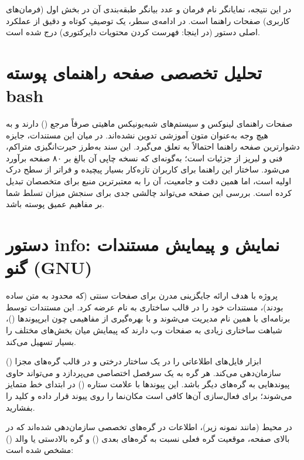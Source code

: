 در این نتیجه،  نمایانگر نام فرمان و عدد  بیانگر طبقه‌بندی آن در بخش اول (فرمان‌های کاربری) صفحات راهنما است. در ادامه‌ی سطر، یک توصیفِ کوتاه و دقیق از عملکرد اصلی دستور (در اینجا: فهرست کردن محتویات دایرکتوری) درج شده است.

\section{تحلیل تخصصی صفحه راهنمای پوسته bash}

صفحات راهنمای لینوکس و سیستم‌های شبه‌یونیکس ماهیتی صرفاً مرجع () دارند و به هیچ وجه به‌عنوان متون آموزشی تدوین نشده‌اند. در میان این مستندات، جایزه دشوارترین صفحه راهنما احتمالاً به  تعلق می‌گیرد. این سند به‌طرز حیرت‌انگیزی متراکم، فنی و لبریز از جزئیات است؛ به‌گونه‌ای که نسخه چاپی آن بالغ بر ۸۰ صفحه برآورد می‌شود. ساختار این راهنما برای کاربران تازه‌کار بسیار پیچیده و فراتر از سطح درک اولیه است، اما همین دقت و جامعیت، آن را به معتبرترین منبع برای متخصصان تبدیل کرده است. بررسی این صفحه می‌تواند چالشی جدی برای سنجش میزان تسلط شما بر مفاهیم عمیق پوسته باشد.

\section{دستور info: نمایش و پیمایش مستندات گنو (GNU)}

پروژه  با هدف ارائه جایگزینی مدرن برای صفحات سنتی  (که محدود به متن ساده بودند)، مستندات خود را در قالب ساختاری به نام  عرضه کرد. این مستندات توسط برنامه‌ای با همین نام مدیریت می‌شوند و با بهره‌گیری از مفاهیمی چون ابرپیوندها ()، شباهت ساختاری زیادی به صفحات وب دارند که پیمایش میان بخش‌های مختلف را بسیار تسهیل می‌کند.

ابزار  فایل‌های اطلاعاتی را در یک ساختار درختی و در قالب گره‌های مجزا () سازمان‌دهی می‌کند. هر گره به یک سرفصل اختصاصی می‌پردازد و می‌تواند حاوی پیوندهایی به گره‌های دیگر باشد. این پیوندها با علامت ستاره (\cmd{*}) در ابتدای خط متمایز می‌شوند؛ برای فعال‌سازی آن‌ها کافی است مکان‌نما را روی پیوند قرار داده و کلید  را بفشارید.

در محیط  (مانند نمونه زیر)، اطلاعات در گره‌های تخصصی سازمان‌دهی شده‌اند که در بالای صفحه، موقعیت گره فعلی نسبت به گره‌های بعدی () و گره بالادستی یا والد () مشخص شده است:


